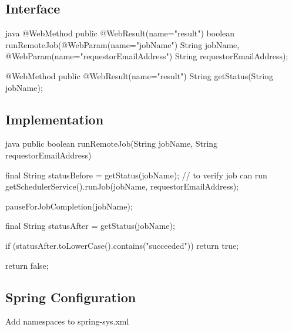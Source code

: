 \documentclass[12pt,notitlepage]{article}
\begin{document}
\begin{s5presentation}
\begin{s5slide}
  \W \end{s5slide}

%
%
  \W \begin{s5slide}
    \section{Interface }
    \begin{code}{java}
@WebMethod
public @WebResult(name="result") boolean runRemoteJob(@WebParam(name="jobName") String jobName,
                                                      @WebParam(name="requestorEmailAddress") String requestorEmailAddress);
     
@WebMethod
public @WebResult(name="result") String getStatus(String jobName);
    \end{code}
    
  \W \end{s5slide}

%
%
  \W \begin{s5slide}
    \section{Implementation }
    \begin{code}{java}
public boolean runRemoteJob(String jobName, String requestorEmailAddress) {
    final String statusBefore = getStatus(jobName);    // to verify job can run
    getSchedulerService().runJob(jobName, requestorEmailAddress);
        
    pauseForJobCompletion(jobName);
        
    final String statusAfter = getStatus(jobName);
        
    if (statusAfter.toLowerCase().contains("succeeded")) {
        return true;
    }
        
    return false;
}
    \end{code}
      
  \W \end{s5slide}

%
%
  \W \begin{s5slide}
    \section{Spring Configuration }
Add namespaces to spring-sys.xml


\end{s5slide}
\end{s5presentation}
\end{document}
